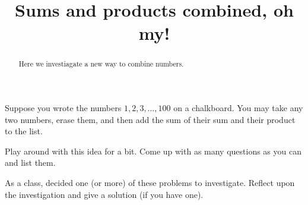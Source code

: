 \documentclass[handout,nooutcomes,space]{ximera}
\title{Sums and products combined, oh my!}
\begin{document}
\begin{abstract}
Here we investiagate a new way to combine numbers.
\end{abstract}
\maketitle

Suppose you wrote the numbers $1,2,3,\dots,100$ on a chalkboard. You
may take any two numbers, erase them, and then add the sum of their
sum and their product to the list.

\begin{problem}
Play around with this idea for a bit. Come up with as many questions
as you can and list them.
\begin{freeResponse}
\end{freeResponse}
\end{problem}

\begin{problem}
As a class, decided one (or more) of these problems to
investigate. Reflect upon the investigation and give a solution (if
you have one).
\begin{freeResponse}
\end{freeResponse}
\end{problem}
\end{document}
